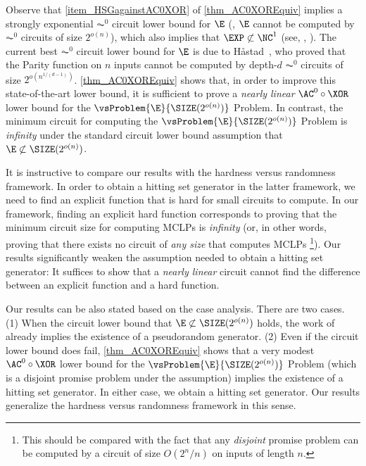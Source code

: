 \documentclass{toc}
\begin{document}
Observe that \cref{item_HSGagainstAC0XOR} of \cref{thm_AC0XOREquiv} implies
a strongly exponential $\AC^0$ circuit lower bound for $\E$
(\ie, $\E$ cannot be computed by $\AC^0$ circuits of size $2^{o(n)}$),
which also implies that $\EXP \not \subset \NC^1$ (see, \eg, \cite{AllenderHMPS08_siamcomp_journals,OliveiraS18_focs_conf,GoldreichW13_eccc_journals}).
The current best $\AC^0$ circuit lower bound for $\E$ is due to H{\aa}stad~\cite{Hastad87_PhD_Thesis},
who proved that the Parity function on $n$ inputs cannot be computed by depth-$d$ $\AC^0$ circuits
of size $2^{o(n^{1 / (d-1)})}$.
%
\cref{thm_AC0XOREquiv} shows that, in order to improve this state-of-the-art lower bound,
it is sufficient to prove a \emph{nearly linear} $\AC^0 \circ \XOR$ lower bound for
the $\vsProblem{\E}{\SIZE(2^{o(n)})}$ Problem.
In contrast,
the minimum circuit for computing
the $\vsProblem{\E}{\SIZE(2^{o(n)})}$ Problem
is \emph{infinity}
under the standard circuit lower bound assumption that $\E \not\subset \SIZE(2^{o(n)})$.

It is instructive to compare our results with the hardness versus randomness framework.
In order to obtain a hitting set generator
in the latter framework, we need to find an explicit function that
is hard for small circuits to compute.
In our framework,
finding an explicit hard function
corresponds to proving that the minimum circuit size for computing MCLPs is \emph{infinity}
(or, in other words, proving that there exists no circuit of \emph{any size} that computes MCLPs%
\footnote{
  This should be compared with the fact that
  any \emph{disjoint} promise problem can be computed by a circuit of size $O(2^n / n)$
  on inputs of length $n$.
}).
Our results significantly weaken the assumption needed to obtain a hitting set generator:
It suffices to show that a \emph{nearly linear} circuit
cannot find the difference between an explicit function and a hard function.

Our results can be also stated based on the case analysis.
There are two cases.
(1) When the circuit lower bound that $\E \not\subset \SIZE(2^{o(n)})$ holds,
the work of \cite{ImpagliazzoW97_stoc_conf} already implies the existence of a pseudorandom generator.
(2) Even if the circuit lower bound does fail,
\cref{thm_AC0XOREquiv} shows that
a very modest $\AC^0 \circ \XOR$ lower bound for the $\vsProblem{\E}{\SIZE(2^{o(n)})}$ Problem
(which is a disjoint promise problem under the assumption) implies
the existence of a hitting set generator.
In either case, we obtain a hitting set generator.
Our results generalize the hardness versus randomness framework in this sense.
\end{document}
